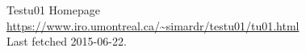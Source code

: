 \documentclass[11pt,a4paper,twoside,openany]{report}
\begin{document}
\pagestyle{empty}


\cleardoublepage



\cleardoublepage
\pagestyle{plain}
\setcounter{page}{1}
\tableofcontents

\newpage
\cleardoublepage
{}







\begin{thebibliography}{99}

  Testu01 Homepage\\
  \url{https://www.iro.umontreal.ca/~simardr/testu01/tu01.html}\\
  Last fetched 2015-06-22.
 
\end{thebibliography}


\end{document}

